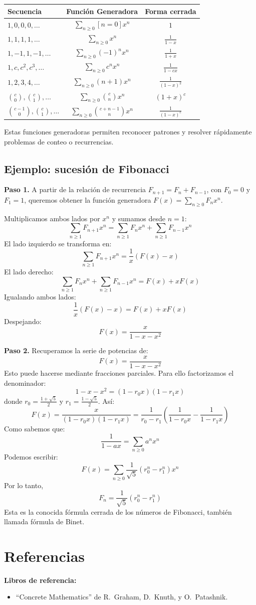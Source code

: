 \begin{center}
\def\arraystretch{1.3}
\begin{tabular}{l|c|c}
\hline
\textbf{Secuencia} & \textbf{Función Generadora} & \textbf{Forma cerrada} \\
\hline\hline
$1, 0, 0, 0, \ldots$ & $\sum_{n\geq 0} [n = 0] x^n$ & $1$ \\
$1, 1, 1, 1, \ldots$ & $\sum_{n\geq 0} x^n$ & $\frac{1}{1 - x}$ \\
$1, -1, 1, -1, \ldots$ & $\sum_{n\geq 0} (-1)^n x^n$ & $\frac{1}{1 + x}$ \\
$1, c, c^2, c^3, \ldots$ & $\sum_{n\geq 0} c^n x^n$ & $\frac{1}{1 - cx}$ \\
$1, 2, 3, 4, \ldots$ & $\sum_{n\geq 0} (n + 1) x^n$ & $\frac{1}{(1 - x)^2}$ \\
$\binom{c}{0}, \binom{c}{1}, \ldots$ & $\sum_{n\geq 0} \binom{c}{n} x^n$ & $(1 + x)^c$ \\
$\binom{c - 1}{0}, \binom{c}{1}, \ldots$ & $\sum_{n\geq 0} \binom{c + n - 1}{n} x^n$ & $\frac{1}{(1 - x)^c}$ \\
\hline
\end{tabular}
\end{center}

Estas funciones generadoras permiten reconocer patrones y resolver rápidamente problemas de conteo o recurrencias.

\bigskip

\subsection{Ejemplo: sucesión de Fibonacci}
\noindent \textbf{Paso 1.} A partir de la relación de recurrencia $F_{n+1} = F_n + F_{n-1}$, con $F_0 = 0$ y $F_1 = 1$, queremos obtener la función generadora $F(x) = \sum_{n \geq 0} F_n x^n$.

\noindent Multiplicamos ambos lados por $x^n$ y sumamos desde $n = 1$:
\[
\sum_{n \geq 1} F_{n+1} x^n = \sum_{n \geq 1} F_n x^n + \sum_{n \geq 1} F_{n-1} x^n
\]
El lado izquierdo se transforma en:
\[
\sum_{n \geq 1} F_{n+1} x^n = \frac{1}{x}(F(x) - x)
\]
El lado derecho:
\[
\sum_{n \geq 1} F_n x^n + \sum_{n \geq 1} F_{n-1} x^n = F(x) + xF(x)
\]
Igualando ambos lados:
\[
\frac{1}{x}(F(x) - x) = F(x) + xF(x)
\]
Despejando:
\[
F(x) = \frac{x}{1 - x - x^2}
\]

\noindent \textbf{Paso 2.} Recuperamos la serie de potencias de:
\[
F(x) = \frac{x}{1 - x - x^2}
\]
Esto puede hacerse mediante fracciones parciales. Para ello factorizamos el denominador:
\[
1 - x - x^2 = (1 - r_0 x)(1 - r_1 x)
\]
donde $r_0 = \frac{1 + \sqrt{5}}{2}$ y $r_1 = \frac{1 - \sqrt{5}}{2}$.
Así:
\[
F(x) = \frac{x}{(1 - r_0 x)(1 - r_1 x)} = \frac{1}{r_0 - r_1} \left(\frac{1}{1 - r_0 x} - \frac{1}{1 - r_1 x}\right)
\]
Como sabemos que:
\[
\frac{1}{1 - ax} = \sum_{n \geq 0} a^n x^n
\]
Podemos escribir:
\[
F(x) = \sum_{n \geq 0} \frac{1}{\sqrt{5}} (r_0^n - r_1^n) x^n
\]
Por lo tanto,
\[
F_n = \frac{1}{\sqrt{5}} (r_0^n - r_1^n)
\]
Esta es la conocida fórmula cerrada de los números de Fibonacci, también llamada fórmula de Binet.

\section*{Referencias}
\textbf{Libros de referencia:}
\begin{itemize}
  \item ``Concrete Mathematics'' de R.~Graham, D.~Knuth, y O.~Patashnik.
\end{itemize}
